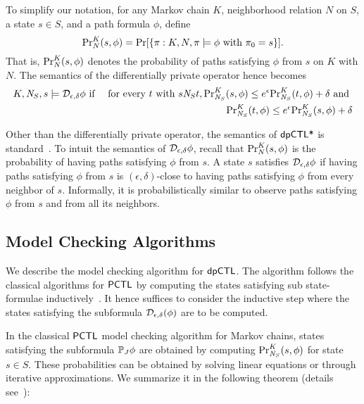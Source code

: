 To simplify our notation, for any Markov chain $K$, neighborhood
relation $N$ on $S$, a state $s \in S$, and a path formula $\phi$,
define
\[
\myPr{s}{K}{N}{\phi} =
\Pr [ \{ \pi : K, N, \pi \models \phi \textmd{ with } \pi_0 = s \} ].
\]
That is, $\myPr{s}{K}{N}{\phi}$ denotes the probability of paths
satisfying $\phi$ from $s$ on $K$ with $N$. The semantics of the
differentially private operator hence becomes
\begin{eqnarray*}
  K, \neighbor{S}, s \models \dpriv{\epsilon}{\delta} \phi
  & \textmd{ if } &
  \textmd{for every } t \textmd{ with }  s \neighbor{S} t,
      \myPr{s}{K}{\neighbor{S}}{\phi} \leq e^{\epsilon}
      \myPr{t}{K}{\neighbor{S}}{\phi} + \delta
      \textmd{ and }\\
  & &  \myPr{t}{K}{\neighbor{S}}{\phi} \leq e^{\epsilon}
       \myPr{s}{K}{\neighbor{S}}{\phi} + \delta
\end{eqnarray*}

Other than the differentially private operator, the semantics of
$\dpCTLstar$ is standard~\cite{BK:08:PMC}.
To intuit the semantics of $\dpriv{\epsilon}{\delta} \phi$,
recall that  $\myPr{s}{K}{N}{\phi}$ is the probability of having
paths satisfying $\phi$ from $s$. A state $s$ satisfies
$\dpriv{\epsilon}{\delta} \phi$ if having paths satisfying $\phi$
from $s$ is $(\epsilon, \delta)$-close to having paths satisfying
$\phi$ from every neighbor of $s$. Informally, it is
probabilistically similar to observe paths satisfying $\phi$ from $s$
and from all its neighbors.

\subsection{Model Checking Algorithms}
We describe the model checking algorithm for $\dpCTL$. The algorithm follows the classical
algorithms for $\PCTL$ by computing the states satisfying
sub state-formulae inductively~\cite{HanssonJ94,BK:08:PMC}. It hence suffices to
consider the inductive step where the states satisfying the subformula
$\dpriv{\epsilon}{\delta} (\phi)$ are to be computed.


In the classical $\PCTL$ model checking algorithm for Markov chains,
states satisfying the subformula $\PJ{J} \phi$ are obtained by
computing $\myPr{s}{K}{\neighbor{S}}{\phi}$ for state $s \in S$.
These probabilities can be obtained by solving linear equations or
through iterative approximations. We summarize it in the following
theorem (details see~\cite{BK:08:PMC}):

